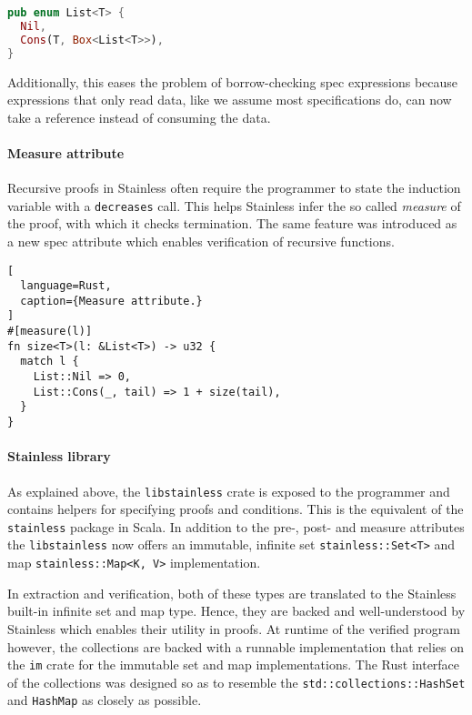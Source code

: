 \begin{lstlisting}[language=Rust]
pub enum List<T> {
  Nil,
  Cons(T, Box<List<T>>),
}
\end{lstlisting}

Additionally, this eases the problem of borrow-checking spec expressions
because expressions that only read data, like we assume most
specifications do, can now take a reference instead of consuming the
data.

\paragraph{Measure attribute}

Recursive proofs in Stainless often require the programmer to state the
induction variable with a \passthrough{\lstinline!decreases!} call. This
helps Stainless infer the so called \emph{measure} of the proof, with
which it checks termination. The same feature was introduced as a new
spec attribute which enables verification of recursive functions.

\begin{lstlisting}[
  language=Rust,
  caption={Measure attribute.}
]
#[measure(l)]
fn size<T>(l: &List<T>) -> u32 {
  match l {
    List::Nil => 0,
    List::Cons(_, tail) => 1 + size(tail),
  }
}
\end{lstlisting}

\paragraph{Stainless library}

As explained above, the \passthrough{\lstinline!libstainless!} crate is
exposed to the programmer and contains helpers for specifying proofs and
conditions. This is the equivalent of the
\passthrough{\lstinline!stainless!} package in Scala. In addition to the
pre-, post- and measure attributes the
\passthrough{\lstinline!libstainless!} now offers an immutable, infinite
set \passthrough{\lstinline!stainless::Set<T>!} and map
\passthrough{\lstinline!stainless::Map<K, V>!} implementation.

In extraction and verification, both of these types are translated to
the Stainless built-in infinite set and map type. Hence, they are backed
and well-understood by Stainless which enables their utility in proofs.
At runtime of the verified program however, the collections are backed
with a runnable implementation that relies on the
\passthrough{\lstinline!im!} crate for the immutable set and map
implementations. The Rust interface of the collections was designed so
as to resemble the \passthrough{\lstinline!std::collections::HashSet!}
and \passthrough{\lstinline!HashMap!} as closely as possible.

